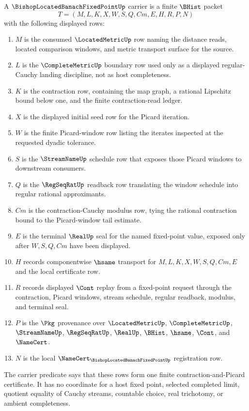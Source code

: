 \begin{definition}
\label{def:bishop-located-banach-fixed-point-carrier}
A $\BishopLocatedBanachFixedPointUp$ carrier is a finite $\BHist$ packet
$$
T=(M,L,K,X,W,S,Q,Cm,E,H,R,P,N)
$$
with the following displayed rows:
\begin{enumerate}
\item $M$ is the consumed $\LocatedMetricUp$ row naming the distance reads, located comparison windows, and metric transport surface for the source.
\item $L$ is the $\CompleteMetricUp$ boundary row used only as a displayed regular-Cauchy landing discipline, not as host completeness.
\item $K$ is the contraction row, containing the map graph, a rational Lipschitz bound below one, and the finite contraction-read ledger.
\item $X$ is the displayed initial seed row for the Picard iteration.
\item $W$ is the finite Picard-window row listing the iterates inspected at the requested dyadic tolerance.
\item $S$ is the $\StreamNameUp$ schedule row that exposes those Picard windows to downstream consumers.
\item $Q$ is the $\RegSeqRatUp$ readback row translating the window schedule into regular rational approximants.
\item $Cm$ is the contraction-Cauchy modulus row, tying the rational contraction bound to the Picard-window tail estimate.
\item $E$ is the terminal $\RealUp$ seal for the named fixed-point value, exposed only after $W,S,Q,Cm$ have been displayed.
\item $H$ records componentwise $\hsame$ transport for $M,L,K,X,W,S,Q,Cm,E$ and the local certificate row.
\item $R$ records displayed $\Cont$ replay from a fixed-point request through the contraction, Picard windows, stream schedule, regular readback, modulus, and terminal seal.
\item $P$ is the $\Pkg$ provenance over $\LocatedMetricUp$, $\CompleteMetricUp$, $\StreamNameUp$, $\RegSeqRatUp$, $\RealUp$, $\BHist$, $\hsame$, $\Cont$, and $\NameCert$.
\item $N$ is the local $\NameCert_{\BishopLocatedBanachFixedPointUp}$ registration row.
\end{enumerate}
The carrier predicate says that these rows form one finite contraction-and-Picard certificate. It has no coordinate for a host fixed point, selected completed limit, quotient equality of Cauchy streams, countable choice, real trichotomy, or ambient completeness.
\end{definition}

